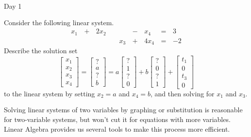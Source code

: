 \begin{applicationActivities}{Day 1}
\begin{activity}{10}
  Consider the following linear system.
  \begin{alignat*}{5}
    x_1 &\,+\,& 2x_2 &\, \,&     &\,-\,&  x_4 &\,=\,& 3 \\
        &\, \,&      &\, \,& x_3 &\,+\,& 4x_4 &\,=\,& -2
  \end{alignat*}
  Describe the solution set
  \[
    \begin{bmatrix}
      x_1 \\
      x_2 \\
      x_3 \\
      x_4
    \end{bmatrix}=
    \begin{bmatrix}
      ? \\
      a \\
      ? \\
      b
    \end{bmatrix}=
    a\begin{bmatrix}
      ? \\
      1 \\
      ? \\
      0
    \end{bmatrix}+
    b\begin{bmatrix}
      ? \\
      0 \\
      ? \\
      1
    \end{bmatrix}+
    \begin{bmatrix}
      t_1 \\
      0 \\
      t_3 \\
      0
    \end{bmatrix}
  \] to the linear system
  by setting \(x_2=a\) and \(x_4=b\), and then solving for \(x_1\) and
  \(x_3\).
\end{activity}

\begin{observation}
  Solving linear systems of two variables by graphing or substitution is
  reasonable for two-variable systems, but won't cut it for equations with
  more variables. Linear Algebra provides us several tools to make this
  process more efficient.
\end{observation}


\end{applicationActivities}
